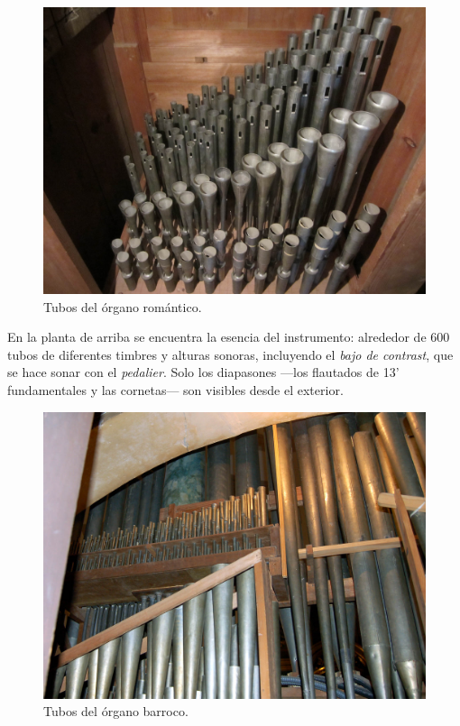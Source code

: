 \begin{figure}[H]
	\noindent \begin{centering}
		\includegraphics[width=\linewidth*2/3]{capitulo3/romantico}
		\par\end{centering}
	\smallskip
	\caption{\label{fig:romantico} Tubos del órgano romántico.}
\end{figure} 

\smallskip

En la planta de arriba se encuentra la esencia del instrumento: alrededor de 600 tubos de diferentes timbres y alturas sonoras, incluyendo el \textit{bajo de contrast}, que se hace sonar con el \textit{pedalier}. Solo los diapasones ---los flautados de 13' fundamentales y las cornetas--- son visibles desde el exterior.

\smallskip

\begin{figure}[H]
	\noindent \begin{centering}
		\includegraphics[width=\linewidth*2/3]{capitulo3/barroco}
		\par\end{centering}
	\smallskip
	\caption{\label{fig:barroco} Tubos del órgano barroco.}
\end{figure} 

